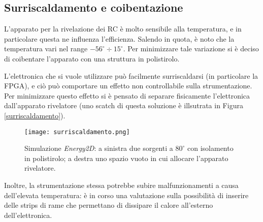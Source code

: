 \subsection*{Surriscaldamento e coibentazione}
L'apparato per la rivelazione dei RC è molto sensibile alla temperatura, e in particolare questa ne influenza l'efficienza. Salendo in quota, è noto che la temperatura vari nel range $-56^{\circ} \div 15^{\circ}$. Per minimizzare tale variazione si è deciso di coibentare l'apparato con una struttura in polistirolo.

L'elettronica che si vuole utilizzare può facilmente surriscaldarsi (in particolare la FPGA), e ciò può comportare un effetto non controllabile sulla strumentazione. Per minimizzare questo effetto si è pensato di separare fisicamente l'elettronica dall'apparato rivelatore (uno scatch di questa soluzione è illsutrata in Figura \ref{surriscaldamento}).

\begin{figure}
    \centering
    \texttt{[image: surriscaldamento.png]}
    \caption{Simulazione \textit{Energy2D}\citep{surriscaldamento}: a sinistra due sorgenti a $80^{\circ}$ con isolamento in polistirolo; a destra uno spazio vuoto in cui allocare l'apparato rivelatore.}
\end{figure}
Inoltre, la strumentazione stessa potrebbe subire malfunzionamenti a causa dell'elevata temperatura: è in corso una valutazione sulla possibilità di inserire delle strips di rame che permettano di dissipare il calore all'esterno dell'elettronica.
